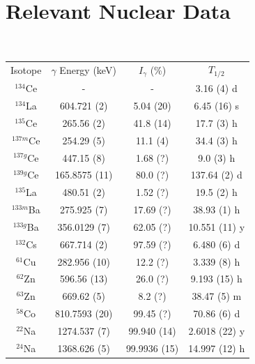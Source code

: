 \documentclass[aps,superscriptaddress,twocolumn,secnumarabic,balancelastpage,amsmath,amssymb,nofootinbib,floatfix]{revtex4-1}
\begin{document}
\section{Relevant Nuclear Data \cite{ensdf}}
\label{nudat_appendix}
\ \ 
\begin{ruledtabular}
\begin{tabular}{cccc}
Isotope & $\gamma$ Energy (keV) & $I_{\gamma}$ (\%) & $T_{1/2}$ \\
$^{134}$Ce & - & - & 3.16 (4) d \\
$^{134}$La & 604.721 (2) & 5.04 (20) & 6.45 (16) s \\
$^{135}$Ce & 265.56 (2) & 41.8 (14) & 17.7 (3) h \\
$^{137m}$Ce & 254.29 (5) & 11.1 (4) & 34.4 (3) h \\
$^{137g}$Ce & 447.15 (8) & 1.68 (?) & 9.0 (3) h \\
$^{139g}$Ce & 165.8575 (11) & 80.0 (?) & 137.64 (2) d \\
$^{135}$La & 480.51 (2) & 1.52 (?) & 19.5 (2) h \\
$^{133m}$Ba & 275.925 (7) & 17.69 (?) & 38.93 (1) h \\
$^{133g}$Ba & 356.0129 (7) & 62.05 (?) & 10.551 (11) y \\
$^{132}$Cs & 667.714 (2) & 97.59 (?) & 6.480 (6) d \\
$^{61}$Cu & 282.956 (10) & 12.2 (?) & 3.339 (8) h \\
$^{62}$Zn & 596.56 (13) & 26.0 (?) & 9.193 (15) h \\
$^{63}$Zn & 669.62 (5) & 8.2 (?) & 38.47 (5) m \\
$^{58}$Co & 810.7593 (20) & 99.45 (?) & 70.86 (6) d \\
$^{22}$Na & 1274.537 (7) & 99.940 (14) & 2.6018 (22) y \\
$^{24}$Na & 1368.626 (5) & 99.9936 (15) & 14.997 (12) h \\
\end{tabular}
\label{table:stack}
\end{ruledtabular}
\ \ 
\end{document}
